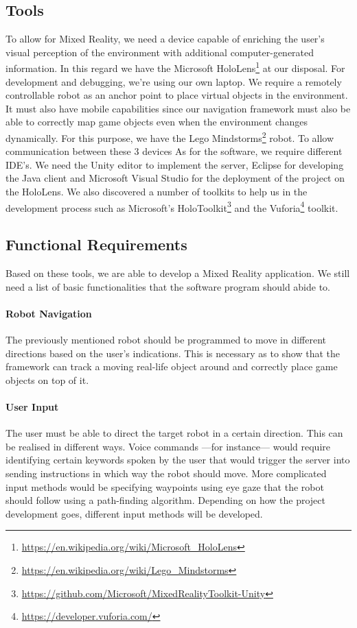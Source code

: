 \subsection{Tools}
To allow for Mixed Reality, we need a device capable of enriching the user's visual perception of the environment with additional computer-generated information. In this regard we have the Microsoft HoloLens\footnote{\url{https://en.wikipedia.org/wiki/Microsoft_HoloLens}} at our disposal. For development and debugging, we're using our own laptop.
\newline
We require a remotely controllable robot as an anchor point to place virtual objects in the environment. It must also have mobile capabilities since our navigation framework must also be able to correctly map game objects even when the environment changes dynamically. For this purpose, we have the Lego Mindstorms\footnote{\url{https://en.wikipedia.org/wiki/Lego_Mindstorms}} robot.
\newline
To allow communication between these 3 devices 
\newline
As for the software, we require different IDE's. We need the Unity editor to implement the server, Eclipse for developing the Java client and Microsoft Visual Studio for the deployment of the project on the HoloLens. We also discovered a number of toolkits to help us in the development process such as Microsoft's HoloToolkit\footnote{\url{https://github.com/Microsoft/MixedRealityToolkit-Unity}} and the Vuforia\footnote{\url{https://developer.vuforia.com/}} toolkit.

\subsection{Functional Requirements}
Based on these tools, we are able to develop a Mixed Reality application. We still need a list of basic functionalities that the software program should abide to.

\paragraph{Robot Navigation}
The previously mentioned robot should be programmed to move in different directions based on the user's indications. This is necessary as to show that the framework can track a moving real-life object around and correctly place game objects on top of it.

\paragraph{User Input}
The user must be able to direct the target robot in a certain direction. This can be realised in different ways. Voice commands ---for instance--- would require identifying certain keywords spoken by the user that would trigger the server into sending instructions in which way the robot should move. More complicated input methods would be specifying waypoints using eye gaze that the robot should follow using a path-finding algorithm. Depending on how the project development goes, different input methods will be developed.


